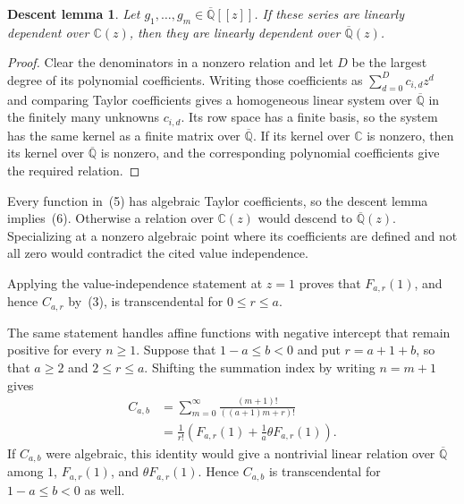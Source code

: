 \documentclass[12pt]{article}
\newtheorem*{descentlemma}{Descent lemma}
\begin{document}
\begin{descentlemma}
Let $g_1,\ldots,g_m\in\overline{\mathbb Q}[[z]]$. If these series are linearly dependent over $\mathbb C(z)$, then they are linearly dependent over $\overline{\mathbb Q}(z)$.
\end{descentlemma}

\begin{proof}
Clear the denominators in a nonzero relation and let $D$ be the largest degree of its polynomial coefficients. Writing those coefficients as $\sum_{d=0}^{D}c_{i,d}z^d$ and comparing Taylor coefficients gives a homogeneous linear system over $\overline{\mathbb Q}$ in the finitely many unknowns $c_{i,d}$. Its row space has a finite basis, so the system has the same kernel as a finite matrix over $\overline{\mathbb Q}$. If its kernel over $\mathbb C$ is nonzero, then its kernel over $\overline{\mathbb Q}$ is nonzero, and the corresponding polynomial coefficients give the required relation.
\end{proof}

Every function in~(5) has algebraic Taylor coefficients, so the descent lemma implies~(6). Otherwise a relation over $\mathbb C(z)$ would descend to $\overline{\mathbb Q}(z)$. Specializing at a nonzero algebraic point where its coefficients are defined and not all zero would contradict the cited value independence.

Applying the value-independence statement at $z=1$ proves that $F_{a,r}(1)$, and hence $C_{a,r}$ by~(3), is transcendental for $0\leq r\leq a$.

The same statement handles affine functions with negative intercept that remain positive for every $n\geq1$. Suppose that $1-a\leq b<0$ and put $r=a+1+b$, so that $a\geq2$ and $2\leq r\leq a$. Shifting the summation index by writing $n=m+1$ gives
\[
\begin{aligned}
C_{a,b}
&=\sum_{m=0}^{\infty}\frac{(m+1)!}{((a+1)m+r)!}\\
&=\frac1{r!}\left(F_{a,r}(1)+\frac1a\theta F_{a,r}(1)\right).
\end{aligned}
\]
If $C_{a,b}$ were algebraic, this identity would give a nontrivial linear relation over $\overline{\mathbb Q}$ among $1$, $F_{a,r}(1)$, and $\theta F_{a,r}(1)$. Hence $C_{a,b}$ is transcendental for $1-a\leq b<0$ as well.
\end{document}
